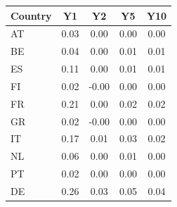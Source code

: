 \begin{tabular}{lcccc}
\toprule
Country & Y1 & Y2 & Y5 & Y10 \\
\midrule
AT & 0.03 & 0.00 & 0.00 & 0.00 \\
BE & 0.04 & 0.00 & 0.01 & 0.01 \\
ES & 0.11 & 0.00 & 0.01 & 0.01 \\
FI & 0.02 & -0.00 & 0.00 & 0.00 \\
FR & 0.21 & 0.00 & 0.02 & 0.02 \\
GR & 0.02 & -0.00 & 0.00 & 0.00 \\
IT & 0.17 & 0.01 & 0.03 & 0.02 \\
NL & 0.06 & 0.00 & 0.01 & 0.00 \\
PT & 0.02 & 0.00 & 0.00 & 0.00 \\
DE & 0.26 & 0.03 & 0.05 & 0.04 \\
\bottomrule
\end{tabular}
